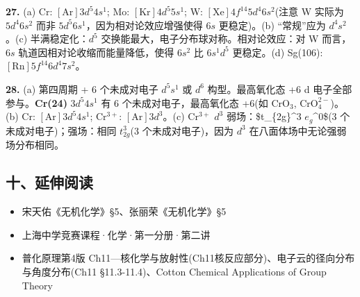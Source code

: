 \textbf{27.} (a) Cr: \([\mathrm{Ar}]3d^5 4s^1\); Mo: \([\mathrm{Kr}]4d^5 5s^1\); W: \([\mathrm{Xe}]4f^{14} 5d^4 6s^2\)(注意 W 实际为 \(5d^4 6s^2\) 而非 \(5d^5 6s^1\)，因为相对论效应增强使得 \(6s\) 更稳定)。(b) ``常规''应为 \(d^4 s^2\)。(c) 半满稳定化：\(d^5\) 交换能最大，电子分布球对称。相对论效应：对 W 而言，\(6s\) 轨道因相对论收缩而能量降低，使得 \(6s^2\) 比 \(6s^1 d^5\) 更稳定。(d) Sg(106): \([\mathrm{Rn}]5f^{14} 6d^4 7s^2\)。

\textbf{28.} (a) 第四周期 + 6 个未成对电子 \箭 \(d^5 s^1\) 或 \(d^6\) 构型。最高氧化态 +6 \箭 d 电子全部参与。\textbf{Cr(24)} \(3d^5 4s^1\) 有 6 个未成对电子，最高氧化态 +6(如 \(\mathrm{CrO_3}\), \(\mathrm{CrO_4^{2-}}\))。(b) Cr: \([\mathrm{Ar}]3d^5 4s^1\); \(\mathrm{Cr^{3+}}\): \([\mathrm{Ar}]3d^3\)。(c) \(\mathrm{Cr^{3+}}\) \(d^3\) 弱场：\$t\_\{2g\}\^{}3 \(e_g\)\^{}0\$(3 个未成对电子)；强场：相同 \(t_{2g}^3\)(3 个未成对电子)，因为 \(d^3\) 在八面体场中无论强弱场分布相同。

\subsection{十、延伸阅读}\label{ux5341ux5ef6ux4f38ux9605ux8bfb}

\begin{itemize}
\tightlist
\item
  宋天佑《无机化学》§5、张丽荣《无机化学》§5
\item
  上海中学竞赛课程·化学·第一分册·第二讲
\item
  普化原理第4版 Ch11---核化学与放射性(Ch11核反应部分)、电子云的径向分布与角度分布(Ch11 §11.3-11.4)、Cotton Chemical Applications of Group Theory
\end{itemize}
